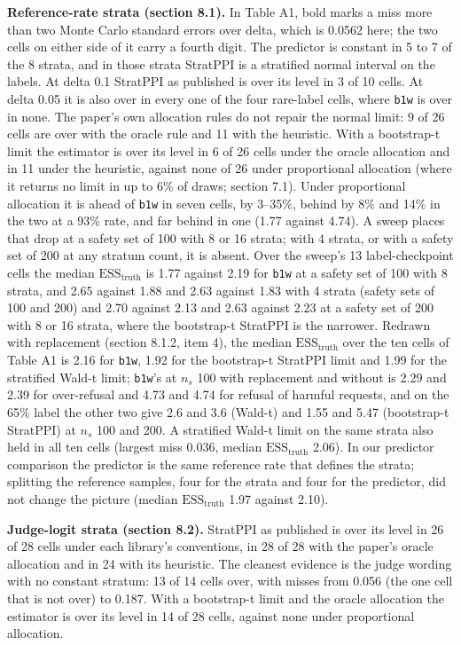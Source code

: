 \documentclass[11pt]{article}
\begin{document}
\textbf{Reference-rate strata (section 8.1).} In Table A1, bold marks a miss more than two Monte Carlo standard errors over delta, which is 0.0562 here; the two cells on either side of it carry a fourth digit. The predictor is constant in 5 to 7 of the 8 strata, and in those strata StratPPI is a stratified normal interval on the labels. At delta 0.1 StratPPI as published is over its level in 3 of 10 cells. At delta 0.05 it is also over in every one of the four rare-label cells, where \texttt{b1w} is over in none. The paper's own allocation rules do not repair the normal limit: 9 of 26 cells are over with the oracle rule and 11 with the heuristic. With a bootstrap-t limit the estimator is over its level in 6 of 26 cells under the oracle allocation and in 11 under the heuristic, against none of 26 under proportional allocation (where it returns no limit in up to 6\% of draws; section 7.1). Under proportional allocation it is ahead of \texttt{b1w} in seven cells, by 3--35\%, behind by 8\% and 14\% in the two at a 93\% rate, and far behind in one (1.77 against 4.74). A sweep places that drop at a safety set of 100 with 8 or 16 strata; with 4 strata, or with a safety set of 200 at any stratum count, it is absent. Over the sweep's 13 label-checkpoint cells the median $\mathrm{ESS}_{\mathrm{truth}}$ is 1.77 against 2.19 for \texttt{b1w} at a safety set of 100 with 8 strata, and 2.65 against 1.88 and 2.63 against 1.83 with 4 strata (safety sets of 100 and 200) and 2.70 against 2.13 and 2.63 against 2.23 at a safety set of 200 with 8 or 16 strata, where the bootstrap-t StratPPI is the narrower. Redrawn with replacement (section 8.1.2, item 4), the median $\mathrm{ESS}_{\mathrm{truth}}$ over the ten cells of Table A1 is 2.16 for \texttt{b1w}, 1.92 for the bootstrap-t StratPPI limit and 1.99 for the stratified Wald-t limit; \texttt{b1w}'s at $n_{s}$ 100 with replacement and without is 2.29 and 2.39 for over-refusal and 4.73 and 4.74 for refusal of harmful requests, and on the 65\% label the other two give 2.6 and 3.6 (Wald-t) and 1.55 and 5.47 (bootstrap-t StratPPI) at $n_{s}$ 100 and 200. A stratified Wald-t limit on the same strata also held in all ten cells (largest miss 0.036, median $\mathrm{ESS}_{\mathrm{truth}}$ 2.06). In our predictor comparison the predictor is the same reference rate that defines the strata; splitting the reference samples, four for the strata and four for the predictor, did not change the picture (median $\mathrm{ESS}_{\mathrm{truth}}$ 1.97 against 2.10).


\textbf{Judge-logit strata (section 8.2).} StratPPI as published is over its level in 26 of 28 cells under each library's conventions, in 28 of 28 with the paper's oracle allocation and in 24 with its heuristic. The cleanest evidence is the judge wording with no constant stratum: 13 of 14 cells over, with misses from 0.056 (the one cell that is not over) to 0.187. With a bootstrap-t limit and the oracle allocation the estimator is over its level in 14 of 28 cells, against none under proportional allocation.
\end{document}
